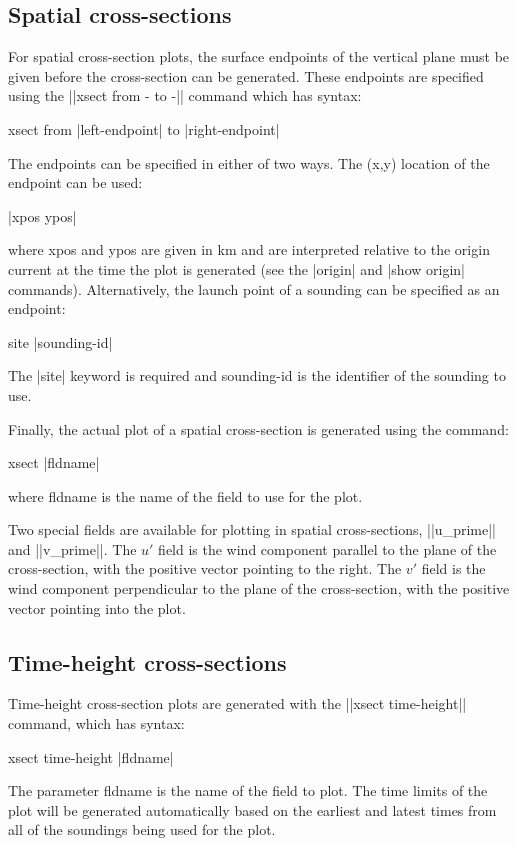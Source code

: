 \subsection{Spatial cross-sections}
For spatial cross-section plots, the surface endpoints of the vertical 
plane must be given before the cross-section can be generated.  These 
endpoints are specified using the ||xsect from - to -|| command 
which has syntax:
\begin{example}
	xsect from |left-endpoint| to |right-endpoint|
\end{example}
The endpoints can be specified in either of two ways.  The (x,y) location
of the endpoint can be used:
\begin{example}
	|xpos ypos|
\end{example}
where {\pf xpos} and {\pf ypos} are given in km and are interpreted relative
to the origin current at the time the plot is generated (see the |origin| and
|show origin| commands).  Alternatively, the launch point of a sounding
can be specified as an endpoint:
\begin{example}
	site |sounding-id|
\end{example}
The |site| keyword is required and {\pf sounding-id} is the identifier of
the sounding to use.

Finally, the actual plot of a spatial cross-section is generated using the
command:
\begin{example}
	xsect |fldname|
\end{example}
where {\pf fldname} is the name of the field to use for the plot.

Two special fields are available for plotting in spatial cross-sections,
||u_prime|| and ||v_prime||.  The $u'$ field is the wind component parallel
to the plane of the cross-section, with the positive vector pointing to
the right.  The $v'$ field is the wind component perpendicular to the
plane of the cross-section, with the positive vector pointing into the plot.

\subsection{Time-height cross-sections}
Time-height cross-section plots are generated with the ||xsect time-height||
command, which has syntax:
\begin{example}
	xsect time-height |fldname|
\end{example}
The parameter {\pf fldname} is the name of the field to plot.  The time
limits of the plot will be generated automatically based on the earliest
and latest times from all of the soundings being used for the plot.

